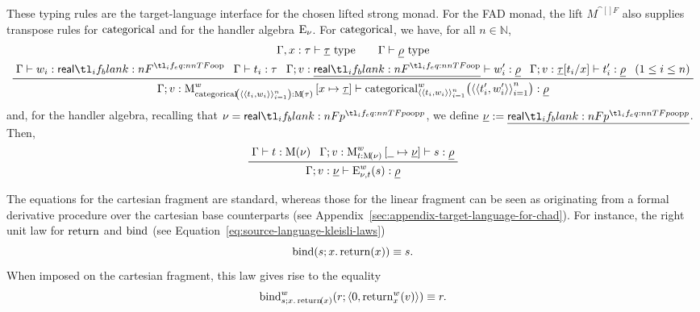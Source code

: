 \documentclass[11pt,a4paper]{article}
\theoremstyle{definition}
\theoremstyle{remark}
\providecommand{\N}{\mathbb{N}}
\providecommand{\casubst}[3]{#1[#3/#2]}
\providecommand{\lintype}[1]{\underline{#1}}
\begin{document}
These typing rules are the target-language interface for the chosen lifted strong monad. For the FAD monad, the lift \(M^{\cat[]{F}}\) also supplies transpose rules for \( \opn[b]{categorical} \) and for the handler algebra \( \opn[b]{E}_{\nu} \). For \( \opn[b]{categorical} \), we have, for all \( n \in \N \),
\begin{equation}
  \label{eq:target-language-typing-rule-categorical}
  \begin{gathered}
    \Gamma, x : \tau \vdash \lintype{\tau} \text{ type}
    \qquad
    \Gamma \vdash \lintype{\rho} \text{ type}
    \\
    \prftree{
      \Gamma \vdash w_{i} : \srcreal
    }{
      \Gamma \vdash t_{i}: \tau
    }{
      \Gamma; v : \lintype{\srcreal}
      \vdash
      w_{i}' : \lintype{\rho}
    }{
      \Gamma; v : \casubst{\lintype{\tau}}{x}{t_{i}}
      \vdash
      t_{i}' : \lintype{\rho}
    }{
      \left( 1 \le i \le n \right)
    }{
      \Gamma; v : \opn[b]{M}^{w}_{
        \fn[n]{ \opn[b]{categorical} }{
          \tuple{ \tuple{ t_{i}, w_{i} } }_{i = 1}^{n}
        } : \Fun[nn]{ \opn[b]{M} }{ \tau }
      } \left[ x \mapsto \lintype{\tau} \right]
      \vdash
      \fn[n]{
        \opn[b]{categorical}^{w}_{
          \tuple{ \tuple{ t_{i}, w_{i} } }_{i = 1}^{n}
        }
      }{
          \tuple{ \tuple{ t_{i}', w_{i}' } }_{i = 1}^{n}
      }
      : \lintype{\rho}
    }
  \end{gathered}
\end{equation}
and, for the handler algebra, recalling that \( \nu = \srcreal[p] \), we define \( \lintype{\nu} := \lintype{\srcreal[p]} \). Then,
\begin{equation}
  \label{eq:target-language-typing-rule-handler-algebra}
  \prftree{
    \Gamma \vdash t : \Fun[nn]{ \opn[b]{M} }{ \nu }
  }{
    \Gamma; v : \opn[b]{M}^{w}_{t: \Fun[nn]{ \opn[b]{M} }{ \nu }}
    \left[ \underline{\hphantom{x}} \mapsto \lintype{\nu} \right]
    \vdash s : \lintype{\rho}
  }{
    \Gamma; v : \lintype{\nu}
    \vdash
    \fn[n]{ \opn[b]{E}^{w}_{\nu, t} }{ s } : \lintype{\rho}
  }
\end{equation}

The equations for the cartesian fragment are standard, whereas those for the linear fragment can be seen as originating from a formal derivative procedure over the cartesian base counterparts (see Appendix~\ref{sec:appendix-target-language-for-chad}). For instance, the right unit law for \( \opn[b]{return} \) and  \( \opn[b]{bind} \) (see Equation~\eqref{eq:source-language-kleisli-laws})
\begin{equation*}
  \fn[n]{\opn[b]{bind}}{
    s;
    x.\fn[n]{\opn[b]{return}}{x}
  }
  \equiv
  s.
\end{equation*}
When imposed on the cartesian fragment, this law gives rise to the equality
\begin{equation}
  \label{eq:target-language-monad-w-right-unit}
  \fn[n]{
    \opn[b]{bind}^{w}_{
      s;
      x.\fn[n]{\opn[b]{return}}{x}
    }
  }{
    r;
    \tuple{
      \opn[b]{0},
      \fn[n]{\opn[b]{return}^{w}_{x}}{v}
    }
  }
  \equiv
  r .
\end{equation}
\end{document}
